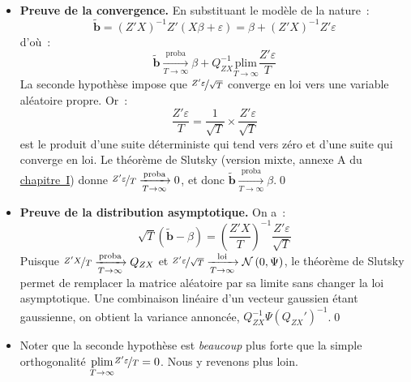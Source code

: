 \documentclass[10pt,a4paper]{article}
\newcommand{\siteurl}{https://le-mans.adjemian.eu/econometrics}
\newcommand{\chapref}[2]{\href{\siteurl/chapitre-#1.pdf}{chapitre~#2}}
\newcommand{\normal}[2]{\mathcal N\left(#1,#2\right)}
\newcommand{\plim}{\xrightarrow[T\rightarrow\infty]{\text{proba}}}
\newcommand{\dlim}{\xrightarrow[T\rightarrow\infty]{\text{loi}}}
\theoremstyle{definition}
\renewcommand{\newline}{\unskip\par\vspace{1.5pt}}
\begin{document}
\begin{notes}

  \begin{itemize}

  \item \textbf{Preuve de la convergence.} En substituant le modèle de la
    nature~:
    \[
      \tilde{\mathbf b} = (Z'X)^{-1}Z'\left(X\beta + \varepsilon\right) = \beta + (Z'X)^{-1}Z'\varepsilon
    \]
    d'où~:
    \[
      \tilde{\mathbf b} \plim \beta + Q_{ZX}^{-1}\underset{T\rightarrow\infty}{\text{plim}} \frac{Z'\varepsilon}{T}
    \]
    La seconde hypothèse impose que $\nicefrac{Z'\varepsilon}{\sqrt T}$ converge
    en loi vers une variable aléatoire propre. Or~:
    \[
      \frac{Z'\varepsilon}{T} = \frac{1}{\sqrt T}\times\frac{Z'\varepsilon}{\sqrt T}
    \]
    est le produit d'une suite déterministe qui tend vers zéro et d'une suite qui
    converge en loi. Le théorème de Slutsky
    (version mixte, annexe A du \chapref{1}{I}) donne
    $\nicefrac{Z'\varepsilon}{T}\plim 0$, et donc
    $\tilde{\mathbf b}\plim\beta$.\qed\newline

  \item \textbf{Preuve de la distribution asymptotique.} On a~:
    \[
      \sqrt{T}\left(\tilde{\mathbf b} - \beta\right) = \left(\frac{Z'X}{T}\right)^{-1} \frac{Z'\varepsilon}{\sqrt{T}}
    \]
    Puisque $\nicefrac{Z'X}{T}\plim Q_{ZX}$ et
    $\nicefrac{Z'\varepsilon}{\sqrt T}\dlim\normal{0}{\Psi}$, le théorème de
    Slutsky permet de remplacer la matrice aléatoire par sa limite sans changer
    la loi asymptotique. Une combinaison linéaire d'un vecteur gaussien étant
    gaussienne, on obtient la variance annoncée,
    $Q_{ZX}^{-1}\Psi\left(Q_{ZX}'\right)^{-1}$.\qed\newline

  \item Noter que la seconde hypothèse est \emph{beaucoup} plus forte que la
    simple orthogonalité $\underset{T\rightarrow\infty}{\text{plim}}\nicefrac{Z'\varepsilon}{T}=0$.
    Nous y revenons plus loin.

  \end{itemize}

\end{notes}
\end{document}

